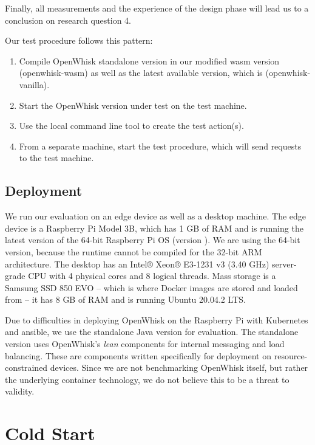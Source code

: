 Finally, all measurements and the experience of the design phase will lead us to a conclusion on research question 4.

Our test procedure follows this pattern:

\begin{enumerate}
    \item Compile OpenWhisk standalone version in our modified wasm version (openwhisk-wasm) as well as the latest available version, which is  (openwhisk-vanilla).
    \item Start the OpenWhisk version under test on the test machine.
    \item Use the local  command line tool to create the test action(s).
    \item From a separate machine, start the test procedure, which will send requests to the test machine.
\end{enumerate}

\subsection{Deployment}

We run our evaluation on an edge device as well as a  desktop machine. The edge device is a Raspberry Pi Model 3B, which has 1 GB of RAM and is running the latest version of the 64-bit Raspberry Pi OS (version ). We are using the 64-bit version, because the  runtime cannot be compiled for the 32-bit ARM architecture. The desktop has an Intel® Xeon® E3-1231 v3 (3.40 GHz) server-grade CPU with 4 physical cores and 8 logical threads. Mass storage is a Samsung SSD 850 EVO -- which is where Docker images are stored and loaded from -- it has 8 GB of RAM and is running Ubuntu 20.04.2 LTS.

Due to difficulties in deploying OpenWhisk on the Raspberry Pi with Kubernetes and ansible, we use the standalone Java version for evaluation. The standalone version uses OpenWhisk's \emph{lean} components for internal messaging and load balancing. These are components written specifically for deployment on resource-constrained devices. Since we are not benchmarking OpenWhisk itself, but rather the underlying container technology, we do not believe this to be a threat to validity.

\section{Cold Start}

